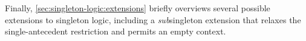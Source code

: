 Finally, \cref{sec:singleton-logic:extensions} briefly overviews several possible extensions to singleton logic, including a \emph{sub}\-singleton extension that relaxes the single-antecedent restriction and permits an empty context.







